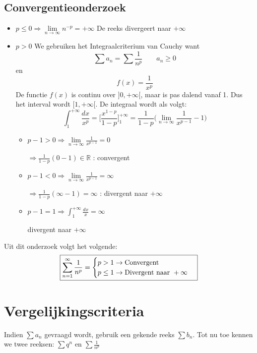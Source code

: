 \subsection{Convergentieonderzoek}
\begin{itemize}
    \item $p \leq 0 \Rightarrow \lim\limits_{n\to\infty} n^{-p} = +\infty$
        De reeks divergeert naar $+\infty$
    \item $p > 0$
        We gebruiken het Integraalcriterium van Cauchy want
        $$\sum a_n = \sum \frac{1}{n^p} \qquad a_n \geq 0$$
        en
        $$f(x) = \frac{1}{x^p}$$
        De functie $f(x)$ is continu over $]0, +\infty[$, maar is pas dalend vanaf 1. Dus het interval wordt $[1, +\infty[$. De integraal wordt als volgt:
        $$\int_{1}^{+\infty} \frac{dx}{x^p} = \bigg[\frac{x^{1 - p}}{1 - p}\bigg]_1^{+\infty} = \frac{1}{1 - p}\bigg(\lim\limits_{n\to\infty}\frac{1}{x^{p-1}} - 1\bigg)$$
        \begin{itemize}[label={als}]
            \item $p - 1 > 0 \Rightarrow \lim\limits_{n\to\infty}\frac{1}{x^{p-1}} = 0$
                    
                    $\Rightarrow \frac{1}{1 - p}(0 - 1) \in \mathbb{R}$ : convergent
                    
            \item $p - 1 < 0 \Rightarrow \lim\limits_{n\to\infty}\frac{1}{x^{p-1}} = \infty$
            
                    $\Rightarrow \frac{1}{1 - p}(\infty - 1) = \infty$ : divergent naar $+\infty$
            
            \item $p - 1 = 1 \Rightarrow \int_1^{+\infty} \frac{dx}{x} = \infty$
            
                divergent naar $+\infty$
        \end{itemize}
        
\end{itemize}
Uit dit onderzoek volgt het volgende:
$$
\boxed{
    \sum_{n = 1}^{\infty} \frac{1}{n^p} = \begin{cases}
                            p > 1 \rightarrow \hbox{Convergent} \\
                            p \leq 1 \rightarrow \hbox{Divergent naar } +\infty \\
                            \end{cases}
}
$$
\section{Vergelijkingscriteria}
Indien $\sum a_n$ gevraagd wordt, gebruik een gekende reeks $\sum b_n$. Tot nu toe kennen we twee reeksen: $\sum q^n$ en $\sum \frac{1}{n^p}$

